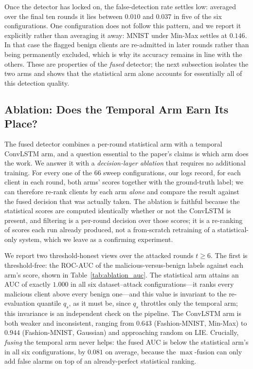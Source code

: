 \documentclass[journal]{IEEEtran}
\begin{document}
Once the detector has locked on, the false-detection rate settles low: averaged over the final ten rounds it lies between $0.010$ and $0.037$ in five of the six configurations. One configuration does not follow this pattern, and we report it explicitly rather than averaging it away: MNIST under Min-Max settles at $0.146$. In that case the flagged benign clients are re-admitted in later rounds rather than being permanently excluded, which is why its accuracy remains in line with the others. These are properties of the \emph{fused} detector; the next subsection isolates the two arms and shows that the statistical arm alone accounts for essentially all of this detection quality.

\subsection{Ablation: Does the Temporal Arm Earn Its Place?}
\label{sec:ablation}

The fused detector combines a per-round statistical arm with a temporal ConvLSTM arm, and a question essential to the paper's claims is which arm does the work. We answer it with a \emph{decision-layer ablation} that requires no additional training. For every one of the $66$ sweep configurations, our logs record, for each client in each round, both arms' scores together with the ground-truth label; we can therefore re-rank clients by each arm \emph{alone} and compare the result against the fused decision that was actually taken. The ablation is faithful because the statistical scores are computed identically whether or not the ConvLSTM is present, and filtering is a per-round decision over those scores; it is a re-ranking of scores each run already produced, not a from-scratch retraining of a statistical-only system, which we leave as a confirming experiment.

We report two threshold-honest views over the attacked rounds $t \ge 6$. The first is threshold-free: the ROC-AUC of the malicious-versus-benign labels against each arm's score, shown in Table~\ref{tab:ablation_auc}. The statistical arm attains an AUC of exactly $1.000$ in all six dataset--attack configurations---it ranks every malicious client above every benign one---and this value is invariant to the re-evaluation quantile $q_s$, as it must be, since $q_s$ throttles only the temporal arm; this invariance is an independent check on the pipeline. The ConvLSTM arm is both weaker and inconsistent, ranging from $0.643$ (Fashion-MNIST, Min-Max) to $0.944$ (Fashion-MNIST, Gaussian) and approaching random on LIE. Crucially, \emph{fusing} the temporal arm never helps: the fused AUC is below the statistical arm's in all six configurations, by $0.081$ on average, because the $\max$-fusion can only add false alarms on top of an already-perfect statistical ranking.
\end{document}
